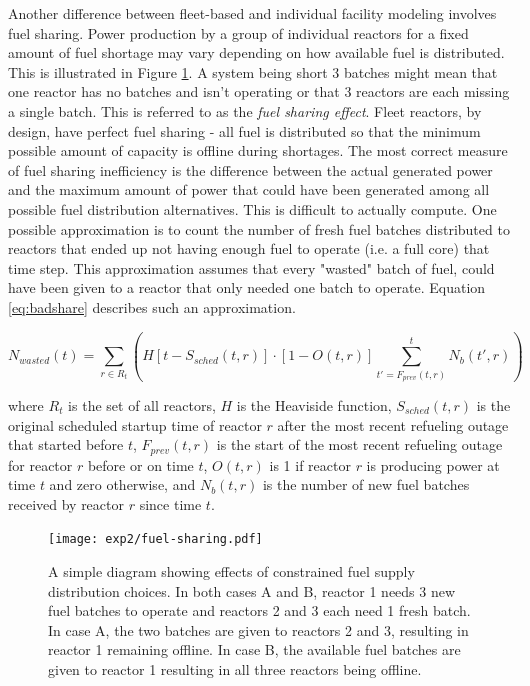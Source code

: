 \documentclass{style}
\begin{document}
Another difference between fleet-based and individual facility modeling
involves fuel sharing.  Power production by a group of individual reactors for
a fixed amount of fuel shortage may vary depending on how available fuel is
distributed.  This is illustrated in Figure \ref{fig:fuel-sharing}.  A system
being short 3 batches might mean that one reactor has no batches and isn't
operating or that 3 reactors are each missing a single batch.  This is
referred to as the \emph{fuel sharing effect}.  Fleet reactors, by design,
have perfect fuel sharing - all fuel is distributed so that the minimum
possible amount of capacity is offline during shortages. The most correct
measure of fuel sharing inefficiency is the difference between the actual
generated power and the maximum amount of power that could have been generated
among all possible fuel distribution alternatives.  This is difficult to
actually compute. One possible approximation is to count the number of fresh
fuel batches distributed to reactors that ended up not having enough fuel to
operate (i.e. a full core) that time step.  This approximation assumes that
every "wasted" batch of fuel, could have been given to a reactor that only
needed one batch to operate.  Equation \ref{eq:badshare} describes such an
approximation.

\begin{equation}
    N_{wasted}(t) = \sum\limits_{r \in R_t} \left(H[t-S_{sched}(t,r)] \cdot [1-O(t,r)]  \sum\limits_{t'=F_{prev}(t,r)}^{t} N_b(t',r) \right)
    \label{eq:badshare}
\end{equation}

where $R_t$ is the set of all reactors, $H$ is the Heaviside function,
$S_{sched}(t,r)$ is the original scheduled startup time of reactor $r$ after
the most recent refueling outage that started before $t$, $F_{prev}(t,r)$ is
the start of the most recent refueling outage for reactor $r$ before or on
time $t$, $O(t,r)$ is 1 if reactor $r$ is producing power at time $t$ and zero
otherwise, and $N_b(t,r)$ is the number of new fuel batches received by
reactor $r$ since time $t$.

\begin{figure}[h]
    \centering
    \texttt{[image: exp2/fuel-sharing.pdf]}
    \caption[The fuel sharing effect]{
        A simple diagram showing effects of constrained fuel supply
        distribution choices. In both cases A and B, reactor 1 needs 3 new
        fuel batches to operate and reactors 2 and 3 each need 1 fresh batch.
        In case A, the two batches are given to reactors 2 and 3, resulting in
        reactor 1 remaining offline. In case B, the available fuel batches are
        given to reactor 1 resulting in all three reactors being offline.
    }
    \label{fig:fuel-sharing}
\end{figure}
\end{document}
